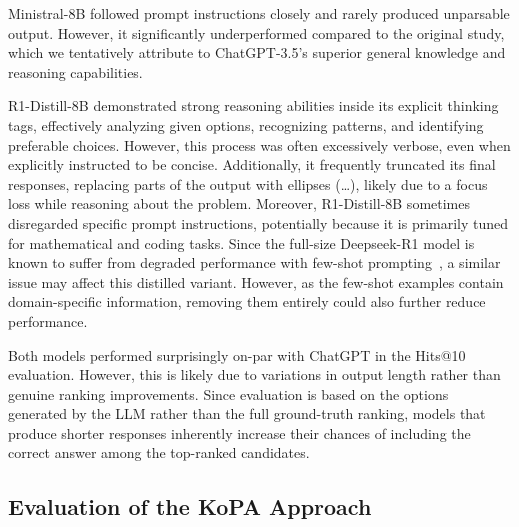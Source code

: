 \documentclass[12pt,a4paper]{article}
\newcommand{\modelministral}{Ministral-8B\xspace}
\newcommand{\modeldeepseek}{R1-Distill-8B\xspace}
\begin{document}
\modelministral followed prompt instructions closely and rarely produced unparsable output.
However, it significantly underperformed compared to the original study,
which we tentatively attribute to ChatGPT-3.5’s superior general knowledge and reasoning capabilities.

\modeldeepseek demonstrated strong reasoning abilities inside its explicit thinking tags, effectively analyzing given options, recognizing patterns, and identifying preferable choices.
However, this process was often excessively verbose, even when explicitly instructed to be concise.
Additionally, it frequently truncated its final responses, replacing parts of the output with ellipses (\dots), likely due to a focus loss while reasoning about the problem.
Moreover, \modeldeepseek sometimes disregarded specific prompt instructions, potentially because it is primarily tuned for mathematical and coding tasks.
Since the full-size Deepseek-R1 model is known to suffer from degraded performance with few-shot prompting~\cite{guo2025deepseek}, a similar issue may affect this distilled variant.
However, as the few-shot examples contain domain-specific information, removing them entirely could  also further reduce performance.

Both models performed surprisingly on-par with ChatGPT in the Hits@10 evaluation.
However, this is likely due to variations in output length rather than genuine ranking improvements.
Since evaluation is based on the options generated by the LLM rather than the full ground-truth ranking, models that produce shorter responses inherently increase their chances of including the correct answer among the top-ranked candidates.


\subsection{Evaluation of the KoPA Approach}
\end{document}

